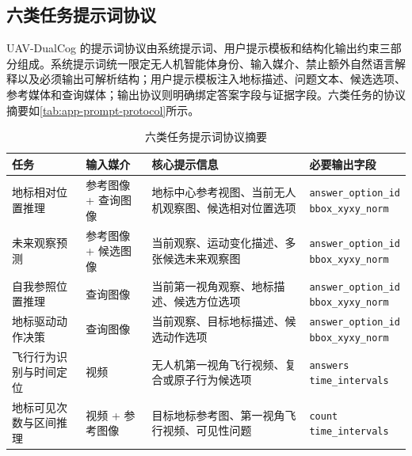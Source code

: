 
\begin{thesisappendix}
\section{六类任务提示词协议}
\label{app:prompt-protocol}

UAV-DualCog 的提示词协议由系统提示词、用户提示模板和结构化输出约束三部分组成。系统提示词统一限定无人机智能体身份、输入媒介、禁止额外自然语言解释以及必须输出可解析结构；用户提示模板注入地标描述、问题文本、候选选项、参考媒体和查询媒体；输出协议则明确绑定答案字段与证据字段。六类任务的协议摘要如\autoref{tab:app-prompt-protocol}所示。

\begin{table}[htbp]
    \centering
    \caption{六类任务提示词协议摘要}
    \label{tab:app-prompt-protocol}
    \small
    \setlength{\tabcolsep}{4pt}
    \begin{tabularx}{\textwidth}{@{}p{2.9cm}p{2.6cm}X>{\raggedright\arraybackslash}p{3.1cm}@{}}
        \toprule
        任务 & 输入媒介 & 核心提示信息 & 必要输出字段 \\
        \midrule
        地标相对位置推理 & 参考图像 + 查询图像 & 地标中心参考视图、当前无人机观察图、候选相对位置选项 & \makecell[l]{\texttt{answer\_option\_id}\\\texttt{bbox\_xyxy\_norm}} \\
        未来观察预测 & 参考图像 + 候选图像 & 当前观察、运动变化描述、多张候选未来观察图 & \makecell[l]{\texttt{answer\_option\_id}\\\texttt{bbox\_xyxy\_norm}} \\
        自我参照位置推理 & 查询图像 & 当前第一视角观察、地标描述、候选方位选项 & \makecell[l]{\texttt{answer\_option\_id}\\\texttt{bbox\_xyxy\_norm}} \\
        地标驱动动作决策 & 查询图像 & 当前观察、目标地标描述、候选动作选项 & \makecell[l]{\texttt{answer\_option\_id}\\\texttt{bbox\_xyxy\_norm}} \\
        飞行行为识别与时间定位 & 视频 & 无人机第一视角飞行视频、复合或原子行为候选项 & \makecell[l]{\texttt{answers}\\\texttt{time\_intervals}} \\
        地标可见次数与区间推理 & 视频 + 参考图像 & 目标地标参考图、第一视角飞行视频、可见性问题 & \makecell[l]{\texttt{count}\\\texttt{time\_intervals}} \\
        \bottomrule
    \end{tabularx}
\end{table}
\end{thesisappendix}

